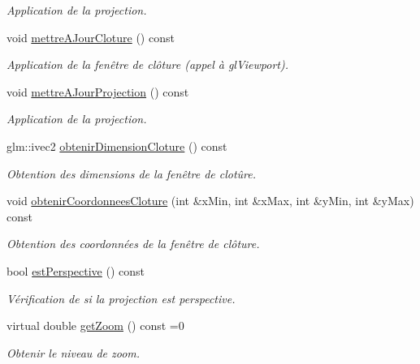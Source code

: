 \begin{DoxyCompactItemize}
\begin{DoxyCompactList}\small\item\em Application de la projection. \end{DoxyCompactList}\item 
void \hyperlink{classvue_1_1_projection_a0a4499967128947206cd3fc34c2b3b20}{mettre\+A\+Jour\+Cloture} () const 
\begin{DoxyCompactList}\small\item\em Application de la fenêtre de clôture (appel à gl\+Viewport). \end{DoxyCompactList}\item 
void \hyperlink{classvue_1_1_projection_abe8290f07564c7b63be04af8c5f68acb}{mettre\+A\+Jour\+Projection} () const 
\begin{DoxyCompactList}\small\item\em Application de la projection. \end{DoxyCompactList}\item 
glm\+::ivec2 \hyperlink{classvue_1_1_projection_aeb123186d5d5816dc09099bfc18f85bf}{obtenir\+Dimension\+Cloture} () const 
\begin{DoxyCompactList}\small\item\em Obtention des dimensions de la fenêtre de clotûre. \end{DoxyCompactList}\item 
void \hyperlink{classvue_1_1_projection_a2e2d21fa9455e872ad27980d0ba80e4b}{obtenir\+Coordonnees\+Cloture} (int \&x\+Min, int \&x\+Max, int \&y\+Min, int \&y\+Max) const 
\begin{DoxyCompactList}\small\item\em Obtention des coordonnées de la fenêtre de clôture. \end{DoxyCompactList}\item 
bool \hyperlink{classvue_1_1_projection_a3d9b70124ec0b3ed22299158abc4067c}{est\+Perspective} () const 
\begin{DoxyCompactList}\small\item\em Vérification de si la projection est perspective. \end{DoxyCompactList}\item 
\hypertarget{classvue_1_1_projection_af1fe061c07ae2be0e471f2088eb8e567}{}virtual double \hyperlink{classvue_1_1_projection_af1fe061c07ae2be0e471f2088eb8e567}{get\+Zoom} () const  =0\label{classvue_1_1_projection_af1fe061c07ae2be0e471f2088eb8e567}

\begin{DoxyCompactList}\small\item\em Obtenir le niveau de zoom. \end{DoxyCompactList}\end{DoxyCompactItemize}
